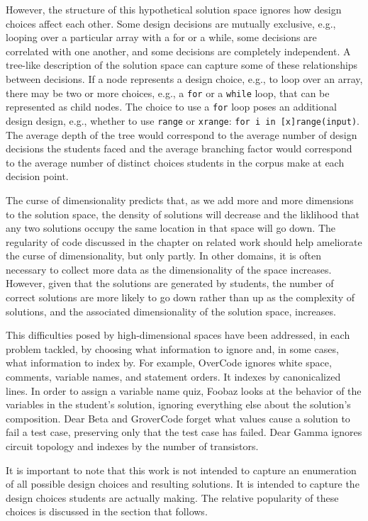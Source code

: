 However, the structure of this hypothetical solution space ignores how design choices affect each other. Some design decisions are mutually exclusive, e.g., looping over a particular array with a for or a while, some decisions are correlated with one another, and some decisions are completely independent. A tree-like description of the solution space can capture some of these relationships between decisions. If a node represents a design choice, e.g., to loop over an array, there may be two or more choices, e.g., a \texttt{for} or a \texttt{while} loop, that can be represented as child nodes. The choice to use a \texttt{for} loop poses an additional design design, e.g., whether to use \texttt{range} or \texttt{xrange}: \texttt{for i in [x]range(input)}. The average depth of the tree would correspond to the average number of design decisions the students faced and the average branching factor would correspond to the average number of distinct choices students in the corpus make at each decision point.

The curse of dimensionality predicts that, as we add more and more dimensions to the solution space, the density of solutions will decrease and the liklihood that any two solutions occupy the same location in that space will go down. The regularity of code discussed in the chapter on related work should help ameliorate the curse of dimensionality, but only partly. In other domains, it is often necessary to collect more data as the dimensionality of the space increases. However, given that the solutions are generated by students, the number of correct solutions are more likely to go down rather than up as the complexity of solutions, and the associated dimensionality of the solution space, increases.

This difficulties posed by high-dimensional spaces have been addressed, in each problem tackled, by choosing what information to ignore and, in some cases, what information to index by. For example, OverCode ignores white space, comments, variable names, and statement orders. It indexes by canonicalized lines. In order to assign a variable name quiz, Foobaz looks at the behavior of the variables in the student's solution, ignoring everything else about the solution's composition. Dear Beta and GroverCode forget what values cause a solution to fail a test case, preserving only that the test case has failed. Dear Gamma ignores circuit topology and indexes by the number of transistors.

It is important to note that this work is not intended to capture an enumeration of all possible design choices and resulting solutions. It is intended to capture the design choices students are actually making. The relative popularity of these choices is discussed in the section that follows.

